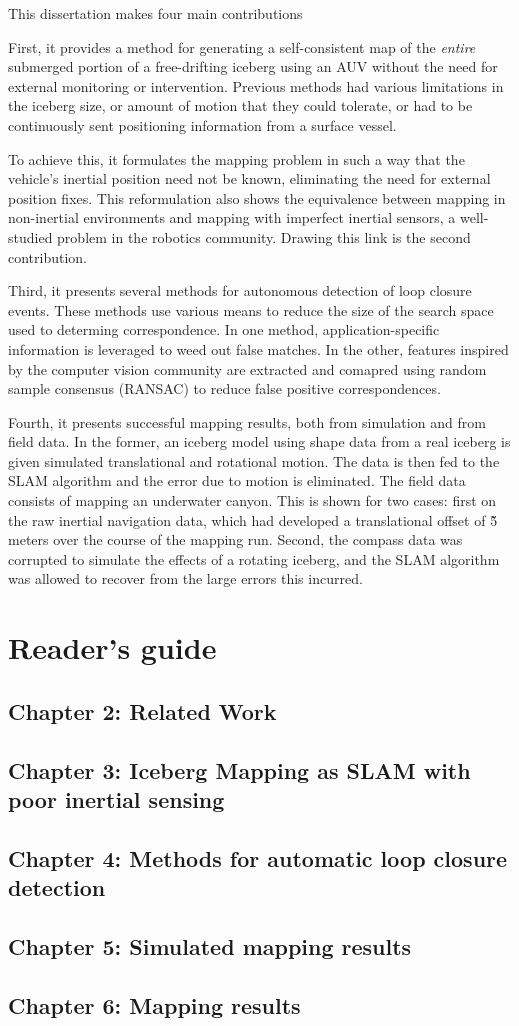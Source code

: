 This dissertation makes four main contributions

First, it provides a method for generating a self-consistent map of the \emph{entire} submerged portion of a free-drifting iceberg using an AUV without the need for external monitoring or intervention. Previous methods had various limitations in the iceberg size, or amount of motion that they could tolerate, or had to be continuously sent positioning information from a surface vessel.

To achieve this, it formulates the mapping problem in such a way that the vehicle's inertial position need not be known, eliminating the need for external position fixes. This reformulation also shows the equivalence between mapping in non-inertial environments and mapping with imperfect inertial sensors, a well-studied problem in the robotics community. Drawing this link is the second contribution. 

Third, it presents several methods for autonomous detection of loop closure events. These methods use various means to reduce the size of the search space used to determing correspondence. In one method, application-specific information is leveraged to weed out false matches. In the other, features inspired by the computer vision community are extracted and comapred using random sample consensus (RANSAC) to reduce  false positive correspondences.

Fourth, it presents successful mapping results, both from simulation and from field data. In the former, an iceberg model using shape data from a real iceberg is given simulated translational and rotational motion. The data is then fed to the SLAM algorithm and the error due to motion is eliminated. The field data consists of mapping an underwater canyon. This is shown for two cases: first on the raw inertial navigation data, which had developed a translational offset of \~5 meters over the course of the mapping run. Second, the compass data was corrupted to simulate the effects of a rotating iceberg, and the SLAM algorithm was allowed to recover from the large errors this incurred.

\section{Reader's guide}

\subsection*{Chapter 2: Related Work}

\subsection*{Chapter 3: Iceberg Mapping as SLAM with poor inertial sensing}

\subsection*{Chapter 4: Methods for automatic loop closure detection}

\subsection*{Chapter 5: Simulated mapping results}

\subsection*{Chapter 6: Mapping results}
